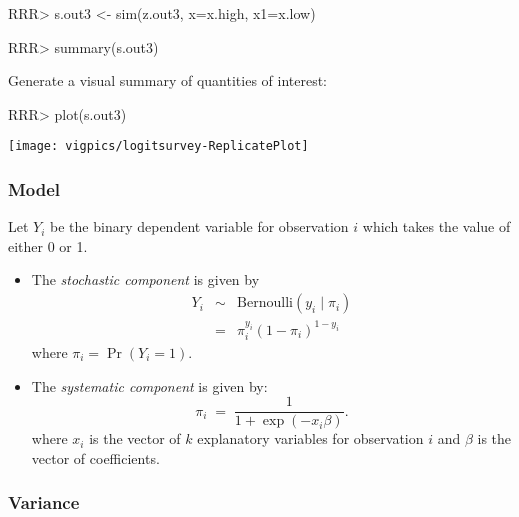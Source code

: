 \begin{enumerate}
\begin{Schunk}
\begin{Sinput}
RRR> s.out3 <- sim(z.out3, x=x.high, x1=x.low)
\end{Sinput}
\end{Schunk}
\begin{Schunk}
\begin{Sinput}
RRR>  summary(s.out3)
\end{Sinput}
\end{Schunk}
Generate a visual summary of quantities of interest:
\begin{center}
\begin{Schunk}
\begin{Sinput}
RRR>  plot(s.out3)
\end{Sinput}
\end{Schunk}
\texttt{[image: vigpics/logitsurvey-ReplicatePlot]}
\end{center}


\end{enumerate}

\subsubsection{Model}
Let $Y_i$ be the binary dependent variable for observation $i$ which
takes the value of either 0 or 1.
\begin{itemize}

\item The \emph{stochastic component} is given by  
\begin{eqnarray*}
Y_i &\sim& \textrm{Bernoulli}(y_i \mid \pi_i) \\
    &=& \pi_i^{y_i} (1-\pi_i)^{1-y_i}
\end{eqnarray*}
where $\pi_i=\Pr(Y_i=1)$.

\item The \emph{systematic component} is given by: 
\begin{equation*}
\pi_i \; = \; \frac{1}{1 + \exp(-x_i \beta)}.
\end{equation*}
where $x_i$ is the vector of $k$ explanatory variables for observation $i$
and $\beta$ is the vector of coefficients.
\end{itemize}

\subsubsection{Variance}

